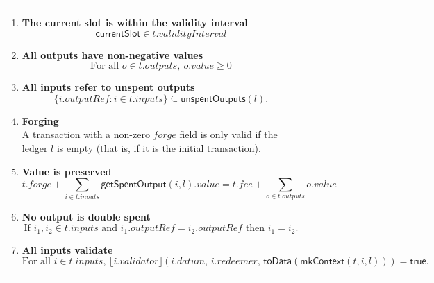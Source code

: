 \documentclass[a4paper]{article}
\renewcommand{\i}{\textit}  %
\newcommand{\s}{\textsf}  %
\newcommand{\msf}[1]{\ensuremath{\mathsf{#1}}}
\newcommand{\mi}[1]{\ensuremath{\mathit{#1}}}
\newcommand\rfskip{7pt}
\newenvironment{ruledfigure}[1]{\begin{figure}[#1]\hrule\vspace{\rfskip}}{\vspace{\rfskip}\hrule\end{figure}}
\newcommand{\true}{\textsf{true}}
\newcommand{\toData}{\ensuremath{\s{toData}}}
\newcommand{\mkContext}{\ensuremath{\s{mkContext}}}
\newcommand{\inputs}{\mi{inputs}}
\newcommand{\outputs}{\mi{outputs}}
\newcommand{\forge}{\mi{forge}}
\newcommand{\fee}{\mi{fee}}
\newcommand{\val}{\mi{value}}  %
\newcommand{\validator}{\mi{validator}}
\newcommand{\redeemer}{\mi{redeemer}}
\newcommand{\datum}{\mi{datum}}
\newcommand{\outputref}{\mi{outputRef}}
\newcommand{\getSpent}{\msf{getSpentOutput}}
\newcommand{\unspent}{\msf{unspentOutputs}}
\newcommand{\applyScript}[1]{\ensuremath{\llbracket#1\rrbracket}}
\begin{document}
\begin{ruledfigure}{H}
\begin{enumerate}

\item
  \label{rule:slot-in-range}
  \textbf{The current slot is within the validity interval}
  \begin{displaymath}
    \msf{currentSlot} \in t.\i{validityInterval}
  \end{displaymath}

\item
  \label{rule:all-outputs-are-non-negative}
  \textbf{All outputs have non-negative values}
  \begin{displaymath}
    \textrm{For all } o \in t.\outputs,\ o.\val \geq 0
  \end{displaymath}

\item
  \label{rule:all-inputs-refer-to-unspent-outputs}
  \textbf{All inputs refer to unspent outputs}
  \begin{displaymath}
    \{i.\outputref: i \in t.\inputs \} \subseteq \unspent(l).
  \end{displaymath}

\item
  \label{rule:forging}
  \textbf{Forging} \\
    A transaction with a non-zero \forge{}
    field is only valid if the ledger $l$ is empty (that
    is, if it is the initial transaction).

\item
  \label{rule:value-is-preserved}
  \textbf{Value is preserved}
  \begin{displaymath}
    t.\forge + \sum_{i \in t.\inputs} \getSpent(i, l).\val = t.\fee + \sum_{o \in t.\outputs} o.\val
  \end{displaymath}

\item
  \label{rule:no-double-spending}
  \textbf{No output is double spent}
  \begin{displaymath}
    \textrm{If } i_1, i_2 \in t.\inputs \textrm{ and }  i_1.\outputref = i_2.\outputref
    \textrm{ then } i_1 = i_2.
  \end{displaymath}

\item
  \label{rule:all-inputs-validate}
  \textbf{All inputs validate}
  \begin{displaymath}
    \textrm{For all } i \in t.\inputs,\ \applyScript{i.\validator}(i.\datum,\, i.\redeemer,
    \,  \toData(\mkContext(t,i,l))) = \true.
  \end{displaymath}


\end{enumerate}
\end{ruledfigure}
\end{document}
